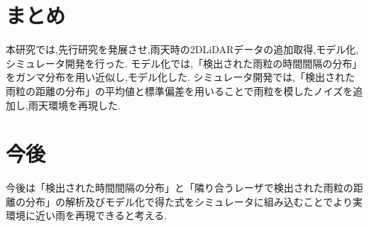 \section{まとめ}
本研究では,先行研究\cite{mura}を発展させ,雨天時の2DLiDARデータの追加取得,モデル化,シミュレータ開発を行った.
モデル化では,「検出された雨粒の時間間隔の分布」をガンマ分布を用い近似し,モデル化した.
シミュレータ開発では,「検出された雨粒の距離の分布」の平均値と標準偏差を用いることで雨粒を模したノイズを追加し,雨天環境を再現した.

\section{今後}
今後は「検出された時間間隔の分布」と「隣り合うレーザで検出された雨粒の距離の分布」の解析及びモデル化で得た式をシミュレータに組み込むことでより実環境に近い雨を再現できると考える.